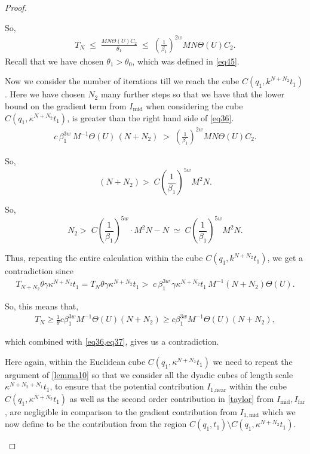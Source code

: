 \documentclass{article}
\newcounter{lem}
\theoremstyle{plain}
\theoremstyle{plain}
\newcommand{\thee}{\Theta(U)}
\theoremstyle{definition}
\theoremstyle{plain}
\begin{document}
\begin{proof}
\begin{itemize}
So,
\begin{align}\label{eq36}
T_N \;\le\; \frac{M N \Theta(U) C_2}{\theta_1}
\;\le\;
\left(\frac{1}{\beta_1}\right)^{2w} M N \Theta(U) C_2 .
\end{align}
Recall that we have chosen $\theta_1>\theta_0$, which was defined in \cref{eq45}.

Now we consider the number of iterations till we reach the cube
\(C(q_1, k^{N+N_2} t_1)\).
Here we have chosen \(N_2\) many further steps so that we have that the lower bound on the gradient term from $I_{\text{mid}}$ when considering the cube $C(q_1, \kappa^{N+N_2}t_1)$, is greater than the right hand side of \cref{eq36}.
\begin{align}\label{eq37}
c\, \beta_1^{3w}\, M^{-1}  \Theta(U) \,(N+N_2)
\;>\;
\left(\frac{1}{\beta_1}\right)^{2w} M N \Theta(U) C_2 .
\end{align}

So,
\[
(N+N_2) >\; C \left(\frac{1}{\beta_1}\right)^{5w} M^2 N .
\]

So,
\[
N_2  >\; C \left(\frac{1}{\beta_1}\right)^{5w}\cdot M^2 N - N
\;\simeq\;
C \left(\frac{1}{\beta_1}\right)^{5w} M^2 N .
\]

Thus, repeating the entire calculation within the cube
\(C(q_1, k^{N+N_2} t_1)\),
we get a contradiction since
\begin{align}\label{eq633}
T_{N+N_2}
\theta
\gamma\kappa^{N+N_2} t_1=T_{N}
\theta
\gamma\kappa^{N+N_2} t_1
>\;
c\, \beta_1^{3w}\, \gamma\kappa^{N+N_2} t_1 \, M^{-1} (N+N_2) \thee.
\end{align}

So, this means that, 
\begin{align}
   T_N\geq \frac{1}{\theta}  c\beta_1^{3w}M^{-1}\Theta(U) (N+N_2)\geq  c\beta_1^{3w}M^{-1}\Theta(U) (N+N_2), 
\end{align}

which combined with \cref{eq36,eq37}, gives us a contradiction.

Here again, within the Euclidean cube $C(q_1,\kappa^{N+N_2}t_1)$ we need to repeat the argument of \cref{lemma10} so that we consider all the dyadic cubes of length scale $\kappa^{N+N_2 +N_1}t_1$, to ensure that the potential contribution $I_{\text{1,near}}$ within the cube $C(q_1, \kappa^{N+N_2}t_1)$ as well as the second order contribution in \cref{taylor} from $I_{\text{mid}}, I_{\text{far}}$, are negligible in comparison to the gradient contribution from $I_{1,\text{mid}} $ which we now define to be the contribution from the region $C(q_1,t_1)\setminus C(q_1, \kappa^{N+N_2}t_1 )$.


\end{itemize}
\end{proof}
\end{document}
